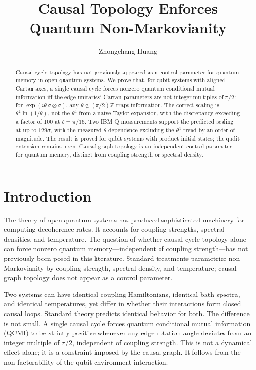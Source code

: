 \documentclass[twocolumn,aps,prl,floatfix]{revtex4-2}
\begin{document}
\title{Causal Topology Enforces Quantum Non-Markovianity}

\author{Zhongchang Huang}


\begin{abstract}
Causal cycle topology has not previously appeared as a control parameter for quantum memory in open quantum systems. We prove that, for qubit systems with aligned Cartan axes, a single causal cycle forces nonzero quantum conditional mutual information iff the edge unitaries' Cartan parameters are not integer multiples of $\pi$/2: for $\exp(i\theta\,\sigma\otimes\sigma)$, any $\theta\notin(\pi/2)\mathbb{Z}$ traps information. The correct scaling is $\theta^2\ln(1/\theta)$, not the $\theta^4$ from a naive Taylor expansion, with the discrepancy exceeding a factor of 100 at $\theta=\pi/16$. Two IBM Q measurements support the predicted scaling at up to $129\sigma$, with the measured $\theta$-dependence excluding the $\theta^4$ trend by an order of magnitude. The result is proved for qubit systems with product initial states; the qudit extension remains open. Causal graph topology is an independent control parameter for quantum memory, distinct from coupling strength or spectral density.
\end{abstract}

\maketitle

\section{Introduction}

The theory of open quantum systems has produced sophisticated machinery for computing decoherence rates. It accounts for coupling strengths, spectral densities, and temperature. The question of whether causal cycle topology alone can force nonzero quantum memory---independent of coupling strength---has not previously been posed in this literature. Standard treatments parametrize non-Markovianity by coupling strength, spectral density, and temperature; causal graph topology does not appear as a control parameter.

Two systems can have identical coupling Hamiltonians, identical bath spectra, and identical temperatures, yet differ in whether their interactions form closed causal loops. Standard theory predicts identical behavior for both. The difference is not small. A single causal cycle forces quantum conditional mutual information (QCMI) to be strictly positive whenever any edge rotation angle deviates from an integer multiple of $\pi$/2, independent of coupling strength. This is not a dynamical effect alone; it is a constraint imposed by the causal graph. It follows from the non-factorability of the qubit-environment interaction.
\end{document}
